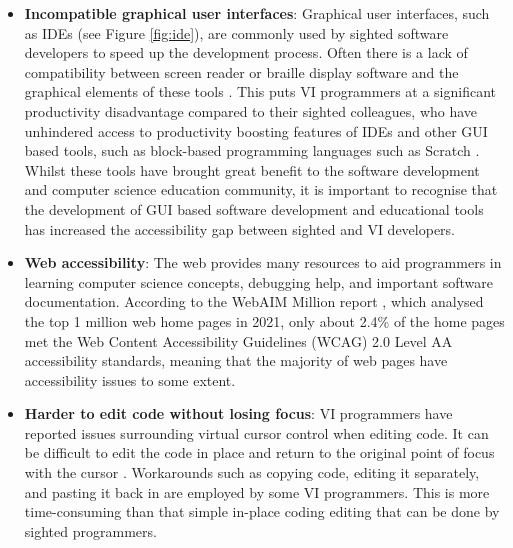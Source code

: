 \documentclass{l4proj}
\begin{document}
\begin{itemize}
\item \textbf{Incompatible graphical user interfaces}: Graphical user interfaces, such as IDEs (see Figure \ref{fig:ide}), are commonly used by sighted software developers to speed up the development process. Often there is a lack of compatibility between screen reader or braille display software and the graphical elements of these tools \cite{GUIDL_2012}. This puts VI programmers at a significant productivity disadvantage compared to their sighted colleagues, who have unhindered access to productivity boosting features of IDEs \cite{ Mountapmbeme_Okafor_Ludi_2022} and other GUI based tools, such as block-based programming languages such as Scratch \cite{scratch}. Whilst these tools have brought great benefit to the software development and computer science education community, it is important to recognise that the development of GUI based software development and educational tools has increased the accessibility gap between sighted and VI developers. \cite{code_mirror_block_2019}



\item \textbf{Web accessibility}: The web provides many resources to aid programmers in learning computer science concepts, debugging help, and important software documentation. According to the WebAIM Million report \cite{webAIM}, which analysed the top 1 million web home pages in 2021, only about 2.4\% of the home pages met the Web Content Accessibility Guidelines (WCAG) 2.0 Level AA accessibility standards, meaning that the majority of web pages have accessibility issues to some extent.

\item \textbf{Harder to edit code without losing focus}: VI programmers have reported issues surrounding virtual cursor control when editing code. It can be difficult to edit the code in place and return to the original point of focus with the cursor \cite{Mealin_Murphy-Hill_2012}. Workarounds such as copying code, editing it separately, and pasting it back in are employed by some VI programmers. This is more time-consuming than that simple in-place coding editing that can be done by sighted programmers. 
\end{itemize}
\end{document}
